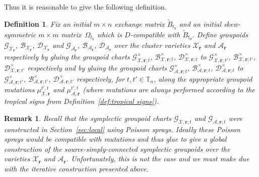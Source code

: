 \documentclass{amsart}
\newtheorem{definition}[theorem]{Definition}
\newtheorem{remark}[theorem]{Remark}
\numberwithin{equation}{section}
\newcommand{\bfr}{{\boldsymbol{r}}}
\newcommand{\cA}{\mathcal{A}}
\newcommand{\cB}{\mathcal{B}}
\newcommand{\cD}{\mathcal{D}}
\newcommand{\cG}{\mathcal{G}}
\newcommand{\cX}{\mathcal{X}}
\newcommand{\TT}{\mathbb{T}}
\begin{document}
Thus it is reasonable to give the following definition.
\begin{definition}
  Fix an initial $m\times n$ exchange matrix $\tilde B_{t_0}$ and an initial skew-symmetric $m\times m$ matrix~$\Omega_{t_0}$ which is $D$-compatible with $\tilde B_{t_0}$.
  Define groupoids $\cG_{\cX_\bfr}$, $\cB_{\cX_\bfr}$, $\cD_{\cX_\bfr}$ and $\cG_{\cA_\bfr}$, $\cB_{\cA_\bfr}$, $\cD_{\cA_\bfr}$ over the cluster varieties $\cX_\bfr$ and $\cA_\bfr$ respectively by gluing the groupoid charts $\cG^\times_{\cX,\bfr;t}$, $\cB^\times_{\cX,\bfr;t}$, $\cD^\times_{\cX,\bfr;t}$ to $\cG^\times_{\cX,\bfr;t'}$, $\cB^\times_{\cX,\bfr;t'}$, $\cD^\times_{\cX,\bfr;t'}$ respectively and by gluing the groupoid charts $\cG^\times_{\cA,\bfr;t}$, $\cB^\times_{\cA,\bfr;t}$, $\cD^\times_{\cA,\bfr;t}$ to $\cG^\times_{\cA,\bfr;t'}$, $\cB^\times_{\cA,\bfr;t'}$, $\cD^\times_{\cA,\bfr;t'}$ respectively, for $t,t'\in\TT_n$, along the appropriate groupoid mutations $\mu_{\cX,\bfr}^{t',t}$ and $\mu_{\cA,\bfr}^{t',t}$ (where mutations are always performed according to the tropical signs from Definition~\ref{def:tropical signs}).
\end{definition}
\begin{remark}
  Recall that the symplectic groupoid charts $\cG_{\cX,\bfr;t}$ and $\cG_{\cA,\bfr;t}$ were constructed in Section~\ref{sec:local} using Poisson sprays.
  Ideally these Poisson sprays would be compatible with mutations and thus glue to give a global construction of the source-simply-connected symplectic groupoids over the varieties $\cX_\bfr$ and $\cA_\bfr$.
  Unfortunately, this is not the case and we must make due with the iterative construction presented above.
\end{remark}
\end{document}
